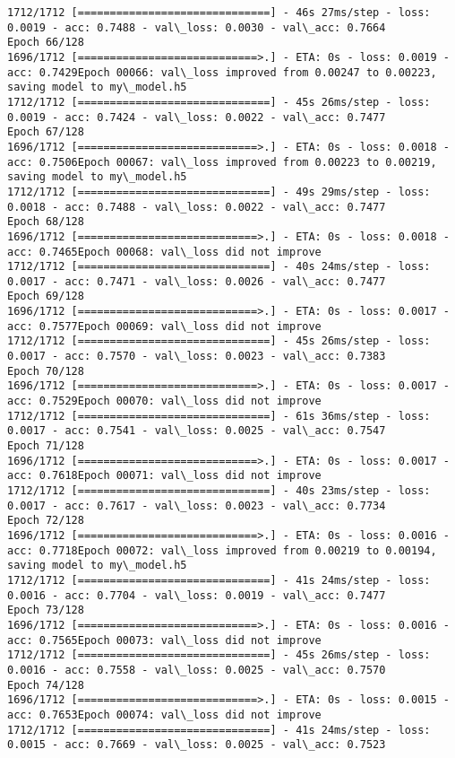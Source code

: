 \documentclass[11pt]{article}
\begin{document}
\begin{Verbatim}[commandchars=\\\{\}]
1712/1712 [==============================] - 46s 27ms/step - loss: 0.0019 - acc: 0.7488 - val\_loss: 0.0030 - val\_acc: 0.7664
Epoch 66/128
1696/1712 [============================>.] - ETA: 0s - loss: 0.0019 - acc: 0.7429Epoch 00066: val\_loss improved from 0.00247 to 0.00223, saving model to my\_model.h5
1712/1712 [==============================] - 45s 26ms/step - loss: 0.0019 - acc: 0.7424 - val\_loss: 0.0022 - val\_acc: 0.7477
Epoch 67/128
1696/1712 [============================>.] - ETA: 0s - loss: 0.0018 - acc: 0.7506Epoch 00067: val\_loss improved from 0.00223 to 0.00219, saving model to my\_model.h5
1712/1712 [==============================] - 49s 29ms/step - loss: 0.0018 - acc: 0.7488 - val\_loss: 0.0022 - val\_acc: 0.7477
Epoch 68/128
1696/1712 [============================>.] - ETA: 0s - loss: 0.0018 - acc: 0.7465Epoch 00068: val\_loss did not improve
1712/1712 [==============================] - 40s 24ms/step - loss: 0.0017 - acc: 0.7471 - val\_loss: 0.0026 - val\_acc: 0.7477
Epoch 69/128
1696/1712 [============================>.] - ETA: 0s - loss: 0.0017 - acc: 0.7577Epoch 00069: val\_loss did not improve
1712/1712 [==============================] - 45s 26ms/step - loss: 0.0017 - acc: 0.7570 - val\_loss: 0.0023 - val\_acc: 0.7383
Epoch 70/128
1696/1712 [============================>.] - ETA: 0s - loss: 0.0017 - acc: 0.7529Epoch 00070: val\_loss did not improve
1712/1712 [==============================] - 61s 36ms/step - loss: 0.0017 - acc: 0.7541 - val\_loss: 0.0025 - val\_acc: 0.7547
Epoch 71/128
1696/1712 [============================>.] - ETA: 0s - loss: 0.0017 - acc: 0.7618Epoch 00071: val\_loss did not improve
1712/1712 [==============================] - 40s 23ms/step - loss: 0.0017 - acc: 0.7617 - val\_loss: 0.0023 - val\_acc: 0.7734
Epoch 72/128
1696/1712 [============================>.] - ETA: 0s - loss: 0.0016 - acc: 0.7718Epoch 00072: val\_loss improved from 0.00219 to 0.00194, saving model to my\_model.h5
1712/1712 [==============================] - 41s 24ms/step - loss: 0.0016 - acc: 0.7704 - val\_loss: 0.0019 - val\_acc: 0.7477
Epoch 73/128
1696/1712 [============================>.] - ETA: 0s - loss: 0.0016 - acc: 0.7565Epoch 00073: val\_loss did not improve
1712/1712 [==============================] - 45s 26ms/step - loss: 0.0016 - acc: 0.7558 - val\_loss: 0.0025 - val\_acc: 0.7570
Epoch 74/128
1696/1712 [============================>.] - ETA: 0s - loss: 0.0015 - acc: 0.7653Epoch 00074: val\_loss did not improve
1712/1712 [==============================] - 41s 24ms/step - loss: 0.0015 - acc: 0.7669 - val\_loss: 0.0025 - val\_acc: 0.7523

\end{Verbatim}
\end{document}
